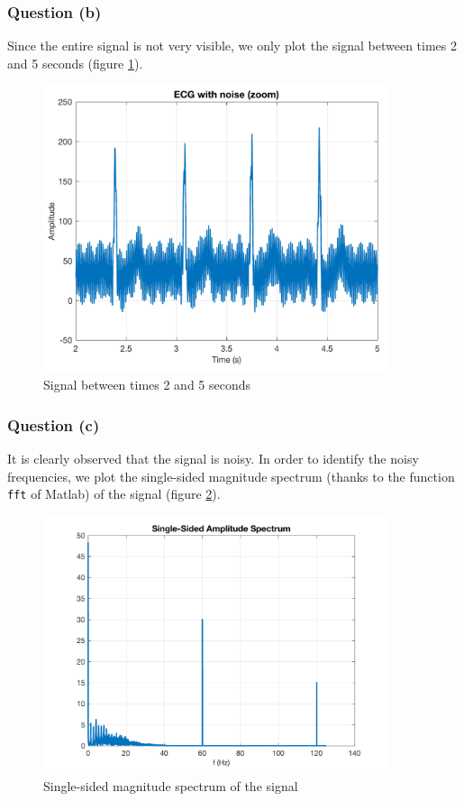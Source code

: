 \documentclass[a4paper, 12pt]{article}
\begin{document}
	\subsubsection*{Question (b)}
	Since the entire signal is not very visible, we only plot the signal between times 2 and 5 seconds (figure \ref{fig:plot_b}).
	\begin{figure}[H]
	    \centering
	    \includegraphics[width=0.9\textwidth]{resources/pdf/plot_b.pdf}
	    \caption{Signal between times 2 and 5 seconds}
	    \label{fig:plot_b}
	\end{figure}
	\subsubsection*{Question (c)}
	It is clearly observed that the signal is noisy. In order to identify the noisy frequencies, we plot the single-sided magnitude spectrum (thanks to the function \texttt{fft} of Matlab) of the signal (figure \ref{fig:plot_c}).
	\begin{figure}[H]
	    \centering
	    \includegraphics[width=0.9\textwidth]{resources/pdf/plot_c.pdf}
	    \caption{Single-sided magnitude spectrum of the signal}
	    \label{fig:plot_c}
	\end{figure}
\end{document}
